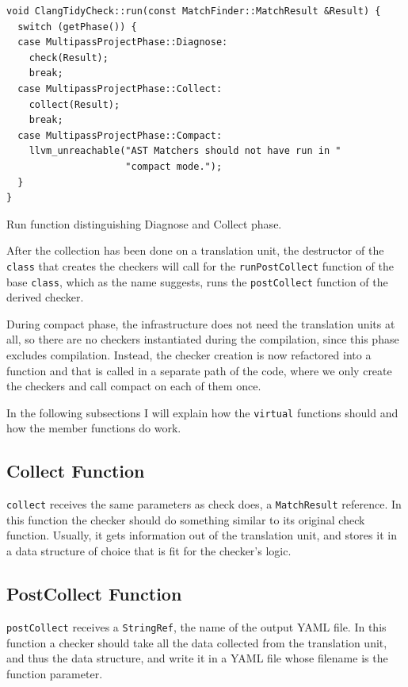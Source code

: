 \begin{listing}[H]
  \begin{verbatim}
void ClangTidyCheck::run(const MatchFinder::MatchResult &Result) {
  switch (getPhase()) {
  case MultipassProjectPhase::Diagnose:
    check(Result);
    break;
  case MultipassProjectPhase::Collect:
    collect(Result);
    break;
  case MultipassProjectPhase::Compact:
    llvm_unreachable("AST Matchers should not have run in "
                     "compact mode.");
  }
}
  \end{verbatim}
  \caption{Run function distinguishing Diagnose and Collect phase.}\label{lst:new-run}
\end{listing}

After the collection has been done on a translation unit, the destructor of the \texttt{class} that
creates the checkers will call for the \texttt{runPostCollect} function of the base
\texttt{class}, which as the name suggests, runs the \texttt{postCollect} function of the derived checker.

During compact phase, the infrastructure does not need the translation units at all, so there are no checkers instantiated during the
compilation, since this phase excludes compilation. Instead, the checker creation is now refactored into a function and that is called
in a separate path of the code, where we only create the checkers and call compact on each of them once.

In the following subsections I will explain how the \texttt{virtual} functions should and how the member functions do work.

\subsection{Collect Function}

\texttt{collect} receives the same parameters as check does, a \texttt{MatchResult} reference. In this function the checker should
do something similar to its original check function. Usually, it gets information out of the translation unit, and stores it in a data
structure of choice that is fit for the checker's logic.

\subsection{PostCollect Function}

\texttt{postCollect} receives a \texttt{StringRef}, the name of the output YAML file. In this function a checker should take all the data
collected from the translation unit, and thus the data structure, and write it in a YAML file whose filename is the function parameter.

